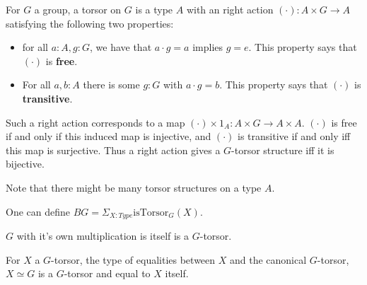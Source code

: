 \begin{definition}
  For $G$ a group, a torsor on $G$ is a type $A$ with an right action $(\cdot) : A \times G \to A$ satisfying the following two properties:
  \begin{itemize}
    \item for all $a:A,g:G$, we have that $a \cdot g = a$ implies $g = e$. This property says that $(\cdot)$ is \textbf{free}.
    \item For all $a,b : A$ there is some $g:G$ with $a \cdot g = b$. This property says that $(\cdot)$ is \textbf{transitive}.
  \end{itemize}
\end{definition}
\begin{remark}
  Such a right action corresponds to a map $(\cdot) \times 1_A : A \times G \to A \times A$. $(\cdot)$ is free if and only if this induced map is injective, and $(\cdot)$ is transitive if and only iff this map is surjective. 
  Thus a right action gives a $G$-torsor structure iff it is bijective. 

  Note that there might be many torsor structures on a type $A$. 
\end{remark}
\begin{definition}
  One can define $BG = \Sigma_{X : Type} \mathrm{isTorsor}_G(X)$.
\end{definition}
\begin{example}
  $G$ with it's own multiplication is itself is a $G$-torsor.
\end{example}
\begin{lemma}
  For $X$ a $G$-torsor, the type of equalities  between $X$ and the canonical $G$-torsor, $X \simeq G$ is a $G$-torsor and equal to $X$ itself. 
\end{lemma}
